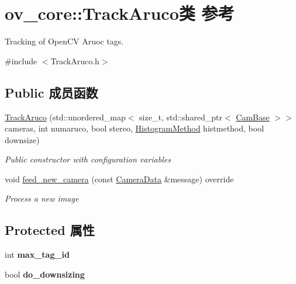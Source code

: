 \hypertarget{classov__core_1_1TrackAruco}{}\section{ov\+\_\+core\+:\+:Track\+Aruco类 参考}
\label{classov__core_1_1TrackAruco}


Tracking of Open\+CV Aruoc tags.  




{\ttfamily \#include $<$Track\+Aruco.\+h$>$}

\subsection*{Public 成员函数}
\begin{DoxyCompactItemize}
\item 
\hyperlink{classov__core_1_1TrackAruco_adaa89be7ced3917bdedc89d69a2269a4}{Track\+Aruco} (std\+::unordered\+\_\+map$<$ size\+\_\+t, std\+::shared\+\_\+ptr$<$ \hyperlink{classov__core_1_1CamBase}{Cam\+Base} $>$$>$ cameras, int numaruco, bool stereo, \hyperlink{classov__core_1_1TrackBase_aa4b34a5dce99b59522d57bf9278c9a1a}{Histogram\+Method} histmethod, bool downsize)
\begin{DoxyCompactList}\small\item\em Public constructor with configuration variables \end{DoxyCompactList}\item 
void \hyperlink{classov__core_1_1TrackAruco_a8c6b74f31cabe516bb9ceb2d2326a2a9}{feed\+\_\+new\+\_\+camera} (const \hyperlink{structov__core_1_1CameraData}{Camera\+Data} \&message) override
\begin{DoxyCompactList}\small\item\em Process a new image \end{DoxyCompactList}\end{DoxyCompactItemize}
\subsection*{Protected 属性}
\begin{DoxyCompactItemize}
\item 
\mbox{\label{classov__core_1_1TrackAruco_aa3ff6eb47e6cadf050de259018b2eeb4}} 
int {\bfseries max\+\_\+tag\+\_\+id}
\item 
\mbox{\label{classov__core_1_1TrackAruco_abac36e58c6ce51e6a4783a4884aa3765}} 
bool {\bfseries do\+\_\+downsizing}
\end{DoxyCompactItemize}
